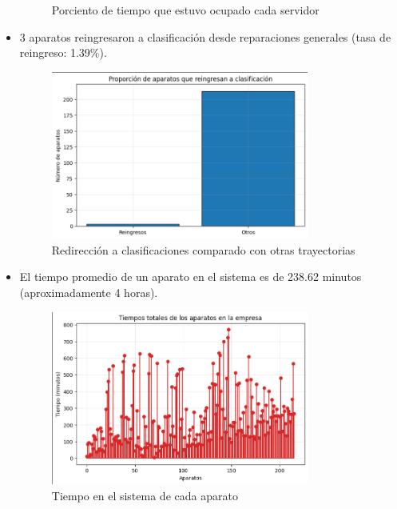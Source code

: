 \documentclass[12pt]{article}
\begin{document}
\begin{itemize}
\begin{figure}[H]
\begin{minipage}{0.45\textwidth}
            \caption{Porciento de tiempo que estuvo ocupado cada servidor}
            \label{fig: Porciento de tiempo que estuvo ocupado cada servidor}
        \end{minipage}
    \end{figure}
    \item 3 aparatos reingresaron a clasificación desde reparaciones generales (tasa de reingreso: 1.39\%).
    \begin{figure}[H]
        \centering
        \includegraphics[width=0.8\textwidth]{clasification.png}
        \caption{Redirección a clasificaciones comparado con otras trayectorias}
        \label{fig: Redirección a clasificaciones comparado con otras trayectorias}
    \end{figure}
    \item El tiempo promedio de un aparato en el sistema es de 238.62 minutos (aproximadamente 4 horas).
    \begin{figure}[H]
        \centering
        \includegraphics[width=0.8\textwidth]{time.png}
        \caption{Tiempo en el sistema de cada aparato}
        \label{fig: Tiempo en el sistema de cada aparato}
    \end{figure}
\end{itemize}
\end{document}
